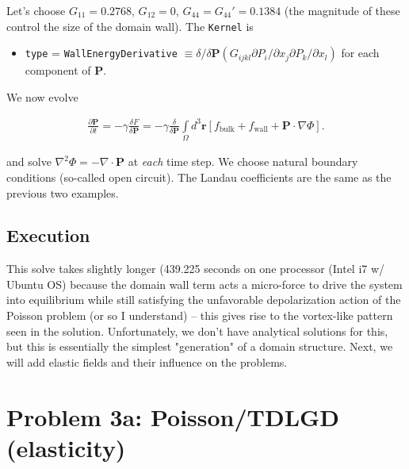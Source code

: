 \documentclass[paper=a4, fontsize=14pt]{scrartcl} %
\numberwithin{equation}{section} %
\numberwithin{figure}{section} %
\numberwithin{table}{section} %
\begin{document}
Let's choose $G_{11} = 0.2768$, $G_{12} = 0$, $G_{44} = G_{44}' = 0.1384$ (the magnitude of these control the size of the domain wall). The \texttt{Kernel} is

\begin{itemize}
\item \texttt{type} = \texttt{WallEnergyDerivative} $\equiv \delta /\delta \textbf{P} \left( G_{ijkl} \partial P_i / \partial x_j \partial P_k /\partial x_l \right)$ for each component of $\textbf{P}$.
\end{itemize}

We now evolve

\begin{align}\nonumber
\frac{\partial \textbf{P}}{\partial t} = - \gamma \frac{\delta F}{\delta \textbf{P}} = - \gamma \frac{\delta}{\delta \textbf{P}} \int\limits_\Omega d^3 \textbf{r} \left[ f_\mathrm{bulk} +  f_\mathrm{wall} + \textbf{P} \cdot \nabla \Phi \right]. 
\end{align}

and solve $\nabla^2 \Phi = - \nabla \cdot \textbf{P}$ at \emph{each} time step. We choose natural boundary conditions (so-called open circuit). The Landau coefficients are the same as the previous two examples.

\subsection*{Execution}

This solve takes slightly longer (439.225 seconds on one processor (Intel i7 w/ Ubuntu OS) because the domain wall term acts a micro-force to drive the system into equilibrium while still satisfying the unfavorable depolarization action of the Poisson problem (or so I understand) -- this gives rise to the vortex-like pattern seen in the solution. Unfortunately, we don't have analytical solutions for this, but this is essentially the simplest "generation" of a domain structure. Next, we will add elastic fields and their influence on the problems.

\newpage

\vspace*{-65pt}

\section*{Problem 3a: Poisson/TDLGD \hspace*{-4pt}(elasticity)}

\vspace*{-10pt}
\end{document}
